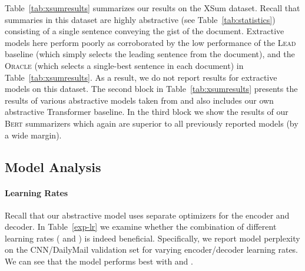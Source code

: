 \documentclass[11pt,a4paper]{article}
\makeatletter
\newcommand{\thickhline}{\noalign {\ifnum 0=`}\fi \hrule height 1pt
    \futurelet \reserved@a \@xhline
}
\makeatother
\begin{document}
    
    Table~\ref{tab:xsumresults} summarizes our results on the XSum
    dataset. Recall that summaries in this dataset are highly
    abstractive (see Table~\ref{tab:statistics}) consisting of a
    single sentence conveying the gist of the document. Extractive
    models here perform poorly as corroborated by the low performance
    of the \textsc{Lead} baseline (which simply selects the leading
    sentence from the document), and the \textsc{Oracle} (which
    selects a single-best sentence in each document) in
    Table~\ref{tab:xsumresults}. As a result, we do not report results
    for extractive models on this dataset.
    The second block in Table~\ref{tab:xsumresults} presents the results
    of various abstractive models taken from \citet{xsum} and also
    includes our own abstractive Transformer baseline. In the third block
    we show the results of our \textsc{Bert} summarizers which again are
    superior to all previously reported models (by a wide margin).
    
    \begin{table}[t]
        \caption{\label{exp-lr} Model perplexity  (CNN/DailyMail; validation set)
            under different combinations of encoder  and decoder
            learning rates.}
    \end{table}
    
    
    \subsection{Model Analysis}
    
    \paragraph{Learning Rates} Recall that our abstractive model uses
    separate optimizers for the encoder and decoder. In Table~\ref{exp-lr}
    we examine whether the combination of different learning rates
    ( and ) is indeed
    beneficial.  Specifically, we report model perplexity on the
    CNN/DailyMail validation set for varying encoder/decoder learning
    rates.  We can see that the model performs best with
     and .
    
\end{document}

